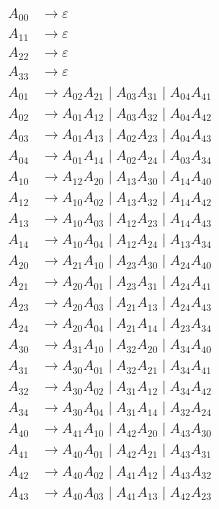 \documentclass[a4paper,11pt, draft]{article}
\newcommand{\ve}{\varepsilon}
\begin{document}
\begin{enumerate}
    \begin{align*}
        A_{00} & \to \ve \\
        A_{11} & \to \ve \\
        A_{22} & \to \ve \\
        A_{33} & \to \ve \\
        A_{01} & \to A_{02}A_{21} \mid A_{03}A_{31} \mid A_{04}A_{41} \\
        A_{02} & \to A_{01}A_{12} \mid A_{03}A_{32} \mid A_{04}A_{42} \\
        A_{03} & \to A_{01}A_{13} \mid A_{02}A_{23} \mid A_{04}A_{43} \\
        A_{04} & \to A_{01}A_{14} \mid A_{02}A_{24} \mid A_{03}A_{34} \\
        A_{10} & \to A_{12}A_{20} \mid A_{13}A_{30} \mid A_{14}A_{40} \\
        A_{12} & \to A_{10}A_{02} \mid A_{13}A_{32} \mid A_{14}A_{42} \\
        A_{13} & \to A_{10}A_{03} \mid A_{12}A_{23} \mid A_{14}A_{43} \\
        A_{14} & \to A_{10}A_{04} \mid A_{12}A_{24} \mid A_{13}A_{34} \\
        A_{20} & \to A_{21}A_{10} \mid A_{23}A_{30} \mid A_{24}A_{40} \\
        A_{21} & \to A_{20}A_{01} \mid A_{23}A_{31} \mid A_{24}A_{41} \\
        A_{23} & \to A_{20}A_{03} \mid A_{21}A_{13} \mid A_{24}A_{43} \\
        A_{24} & \to A_{20}A_{04} \mid A_{21}A_{14} \mid A_{23}A_{34} \\
        A_{30} & \to A_{31}A_{10} \mid A_{32}A_{20} \mid A_{34}A_{40} \\
        A_{31} & \to A_{30}A_{01} \mid A_{32}A_{21} \mid A_{34}A_{41} \\
        A_{32} & \to A_{30}A_{02} \mid A_{31}A_{12} \mid A_{34}A_{42} \\
        A_{34} & \to A_{30}A_{04} \mid A_{31}A_{14} \mid A_{32}A_{24} \\
        A_{40} & \to A_{41}A_{10} \mid A_{42}A_{20} \mid A_{43}A_{30} \\
        A_{41} & \to A_{40}A_{01} \mid A_{42}A_{21} \mid A_{43}A_{31} \\
        A_{42} & \to A_{40}A_{02} \mid A_{41}A_{12} \mid A_{43}A_{32} \\
        A_{43} & \to A_{40}A_{03} \mid A_{41}A_{13} \mid A_{42}A_{23}
    \end{align*}


\end{enumerate}
\end{document}
